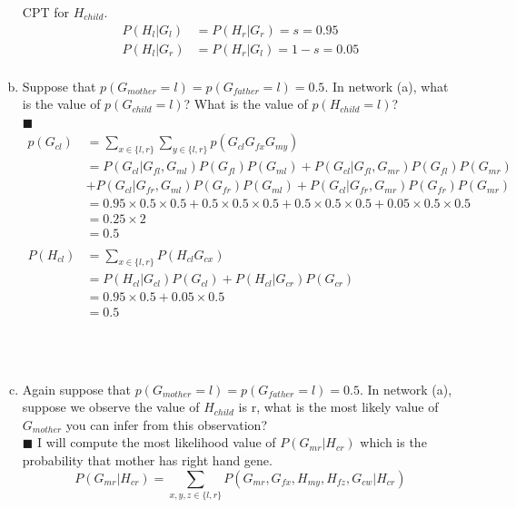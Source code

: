 \documentclass{article}
\newcommand{\solution}[1]{~\\ $\blacksquare$ \sffamily\upshape\selectfont #1
\normalfont ~\\~ }
\begin{document}
\begin{enumerate}[(a)]
    CPT for $H_{child}$. 
    \begin{align*}
      P(H_l|G_l) & = P(H_r|G_r) = s = 0.95 \\ 
      P(H_l|G_r) & = P(H_r|G_l) = 1-s = 0.05 \\ 
    \end{align*}

\item Suppose that $p(G_{mother} = l) = p(G_{father} = l) = 0.5$. In
  network (a), what is the value of $p(G_{child} = l)$? What is the
  value of $p(H_{child} = l)$? 
\solution{
  \begin{align*}
    p(G_{cl}) & = \sum_{x\in \{l,r\}}\sum_{y\in \{l,r\}}p(G_{cl}G_{fx}G_{my})\\ 
    & = P(G_{cl}|G_{fl},G_{ml})P(G_{fl})P(G_{ml}) + 
    P(G_{cl}|G_{fl},G_{mr}) P(G_{fl})P(G_{mr}) \\
    & + P(G_{cl}|G_{fr},G_{ml})P(G_{fr})P(G_{ml}) + 
    P(G_{cl}|G_{fr},G_{mr})P(G_{fr})P(G_{mr}) \\ 
    & = 0.95\times 0.5\times 0.5 + 0.5\times 0.5\times 0.5 + 
    0.5\times 0.5\times 0.5 + 0.05\times 0.5\times 0.5\\ 
    & = 0.25\times 2 \\ 
    & = 0.5 \\ 
    & \\
    P(H_{cl}) & = \sum_{x\in\{l,r\}}P(H_{cl}G_{cx}) \\ 
    & = P(H_{cl}|G_{cl})P(G_{cl}) + P(H_{cl}|G_{cr})P(G_{cr}) \\ 
    & = 0.95\times 0.5 + 0.05\times 0.5 \\ 
    & = 0.5
  \end{align*}
}
\item Again suppose that $p(G_{mother} = l) = p(G_{father} = l) =
0.5$. In network (a), suppose we observe the value of $H_{child}$ is r,
what is the most likely value of $G_{mother}$ you can infer from this
observation?
\solution{
  I will compute the most likelihood value of $P(G_{mr}|H_{cr})$ which is the
  probability that mother has right hand gene.
    \[ P(G_{mr}|H_{cr}) =
    \sum_{x,y,z\in\{l,r\}}P(G_{mr},G_{fx},H_{my},H_{fz},G_{cw}|H_{cr})
    \]
}
\end{enumerate}
\end{document}
